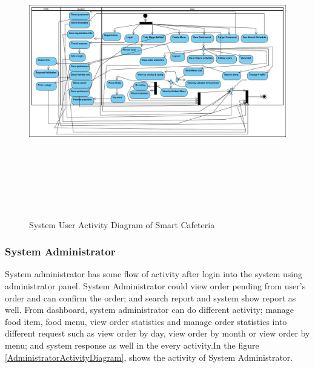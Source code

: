 \begin{landscape}
\begin{figure}[h!t]
    \centering
      \includegraphics[width=8in,height=5in]{ch3/ActivityDiagram/SystemUser}
  \caption{System User Activity Diagram of Smart Cafeteria}
  \label{SystemUserActivityDiagram}
\end{figure}
\end{landscape}

\subsubsection{System Administrator} System administrator has some flow of activity
after login into the system using administrator panel. System Administrator
could view order pending from user's order and can confirm the order; and
search report and system show report as well. From dashboard, system
administrator can do different activity; manage food item, food menu, view order
statistics and manage order statistics into different request such as view order
by day, view order by month or view order by menu; and system response as well
in the every activity.In the figure \ref{AdministratorActivityDiagram}, shows
the activity of System Administrator.

